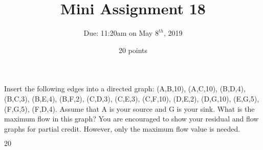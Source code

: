 \documentclass[12pt]{article}
\begin{document}
 
\title{Mini Assignment 18}
\author{Due: 11:20am on May $8^{th}$, 2019}
\date{20 points}
\maketitle

Insert the following edges into a directed graph: (A,B,10), (A,C,10), (B,D,4), (B,C,3), (B,E,4), (B,F,2), (C,D,3), (C,E,3), (C,F,10), (D,E,2), (D,G,10), (E,G,5), (F,G,5), (F,D,4). Assume that A is your source and G is your sink. What is the maximum flow in this graph? You are encouraged to show your residual and flow graphs for partial credit. However, only the maximum flow value is needed.
\begin{center}
	$\boxed{20}$
\end{center}
\end{document}
